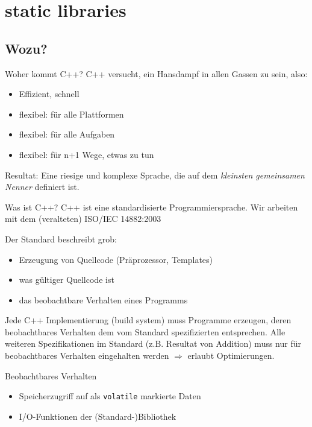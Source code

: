 \section{static libraries}


\subsection{Wozu?}

\begin{frame}{Woher kommt C++?}
	C++ versucht, ein Hansdampf in allen Gassen zu sein, also:
	
	\begin{itemize}
		\item Effizient, schnell
		\item flexibel: für alle Plattformen
		\item flexibel: für alle Aufgaben
		\item flexibel: für n+1 Wege, etwas zu tun
	\end{itemize}
	
	\pause
	\vspace{1em}
	
	\alert{ Resultat: Eine riesige und komplexe Sprache, die auf dem \emph{kleinsten gemeinsamen Nenner} definiert ist. }
\end{frame}

\begin{frame}[fragile]{Was ist C++?}
	C++ ist eine standardisierte Programmiersprache. Wir arbeiten mit dem (veralteten) ISO/IEC 14882:2003
	
	\vspace{1em}
	
	Der Standard beschreibt grob:
	\begin{itemize}
		\item Erzeugung von Quellcode (Präprozessor, Templates)
		\item was gültiger Quellcode ist
		\item das beobachtbare Verhalten eines Programms
	\end{itemize}
	
	\pause
	{\footnotesize
		Jede C++ Implementierung (build system) muss Programme erzeugen, deren beobachtbares Verhalten dem vom Standard spezifizierten entsprechen.
		Alle weiteren Spezifikationen im Standard (z.B. Resultat von Addition) muss nur für beobachtbares Verhalten eingehalten werden $\Longrightarrow$ erlaubt Optimierungen.
	}
	
	\pause
	\vspace{1em}
	
	\begin{block}{Beobachtbares Verhalten}
		\begin{itemize}
			\item Speicherzugriff auf als \verb|volatile| markierte Daten
			\item I/O-Funktionen der (Standard-)Bibliothek
		\end{itemize}
	\end{block}
\end{frame}

